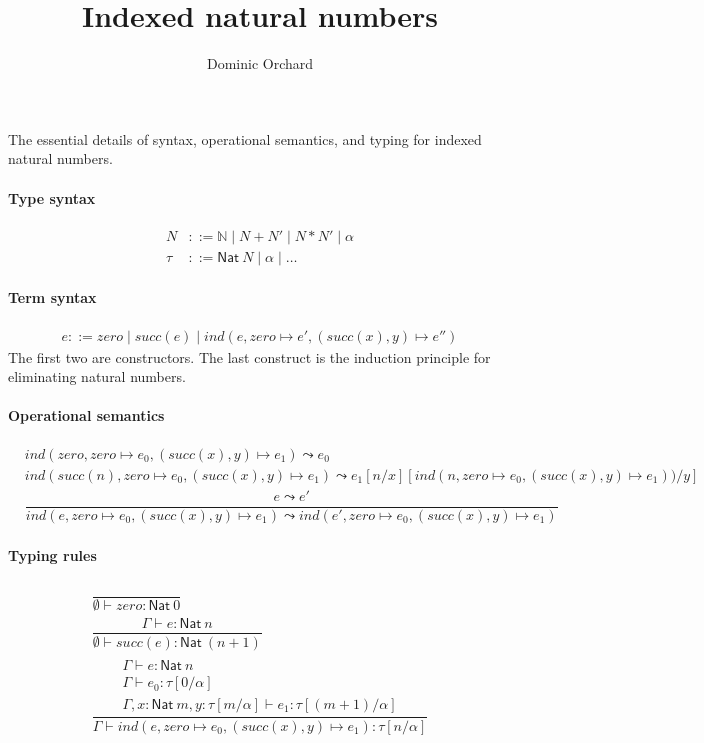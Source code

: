 \documentclass[10pt]{article}
\title{Indexed natural numbers}
\author{Dominic Orchard}
\begin{document}
The essential details of syntax, operational semantics, and typing for indexed natural numbers.

\paragraph{Type syntax}
\begin{align}
\tag{type-level naturals}
N & ::= \mathbb{N} \mid N + N' \mid N * N' \mid \alpha \\
\tag{types} 
\tau & ::= \mathsf{Nat}\ N \mid \alpha \mid \ldots 
\end{align}

\paragraph{Term syntax}
\begin{align*}
e ::= zero \mid succ(e) \mid ind(e, zero \mapsto e', (succ(x), y) \mapsto e'')
\end{align*}
The first two are constructors. The last construct is the induction principle for eliminating
natural numbers.

\paragraph{Operational semantics}
\begin{align*}
& ind(zero, zero \mapsto e_0, (succ(x),y) \mapsto e_1) \leadsto e_0
\\[2em]
& ind(succ(n), zero \mapsto e_0, (succ(x),y) \mapsto e_1) \leadsto e_1[n/x][ind(n,zero \mapsto e_0, (succ(x),y) \mapsto e_1))/y]
\\[2em]
& \dfrac{e \leadsto e'}{ind (e, zero \mapsto e_0, (succ(x),y) \mapsto e_1) \leadsto ind (e', zero \mapsto e_0, (succ(x),y) \mapsto e_1)}
\end{align*}

\paragraph{Typing rules}
\begin{align*}
\begin{array}{c}
\dfrac{}{\emptyset \vdash zero : \mathsf{Nat}\ 0}
\\[2em]
\dfrac{\Gamma \vdash e : \mathsf{Nat}\ n}{\emptyset \vdash succ(e) : \mathsf{Nat}\ (n+1)}
\\[2em]
\dfrac{\begin{array}{l}
       \Gamma \vdash e : \mathsf{Nat}\ n \\ \Gamma \vdash e_0 : \tau[0/\alpha] \\
        \Gamma, x : \mathsf{Nat}\ m, y : \tau[m/\alpha] \vdash e_1 : \tau[(m+1)/\alpha]\end{array}}
      {\Gamma \vdash ind (e, zero \mapsto e_0, (succ(x),y) \mapsto e_1) : \tau[n/\alpha] }
\end{array}
\end{align*}
\end{document}
